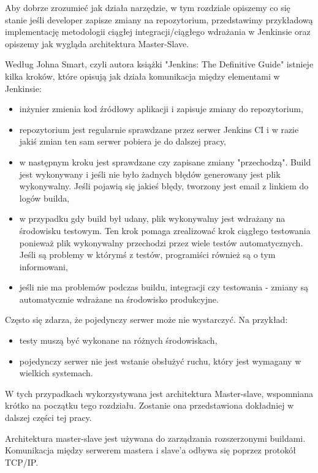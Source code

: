 Aby dobrze zrozumieć jak działa narzędzie, w tym rozdziale opiszemy co się stanie jeśli developer zapisze zmiany na repozytorium, przedstawimy przykładową implementację metodologii ciągłej integracji/ciągłego wdrażania w Jenkinsie oraz opiszemy jak wygląda architektura Master-Slave.

Według Johna Smart, czyli autora książki "Jenkins: The Definitive Guide"\cite{Jenkins} istnieje kilka kroków, które opisują jak działa komunikacja między elementami w Jenkinsie: 
\begin{itemize}
    \item inżynier zmienia kod źródłowy aplikacji i zapisuje zmiany do repozytorium,
    \item repozytorium jest regularnie sprawdzane przez serwer Jenkins CI i w razie jakiś zmian ten sam serwer pobiera je do dalszej pracy,
    \item w następnym kroku jest sprawdzane czy zapisane zmiany "przechodzą". Build  jest wykonywany i jeśli nie było żadnych błędów generowany jest plik wykonywalny. Jeśli pojawią się jakieś błędy, tworzony jest email z linkiem do logów builda,
    \item w przypadku gdy build był udany, plik wykonywalny jest wdrażany na środowisku testowym. Ten krok pomaga zrealizować krok ciągłego testowania ponieważ plik wykonywalny przechodzi przez wiele testów automatycznych. Jeśli są problemy w którymś z testów, programiści również są o tym informowani,
    \item jeśli nie ma problemów podczas buildu, integracji czy testowania - zmiany są automatycznie wdrażane na środowisko produkcyjne.
\end{itemize}



Często się zdarza, że pojedynczy serwer może nie wystarczyć. Na przykład:
\begin{itemize}
    \item testy muszą być wykonane na różnych środowiskach,
    \item pojedynczy serwer nie jest wstanie obsłużyć ruchu, który jest wymagany w wielkich systemach.
\end{itemize}

W tych przypadkach wykorzystywana jest architektura Master-slave, wspomniana krótko na początku tego rozdziału. Zostanie ona przedstawiona dokładniej w dalszej części tej pracy. 

Architektura master-slave jest używana do zarządzania rozszerzonymi buildami. Komunikacja między serwerem mastera i slave'a odbywa się poprzez protokół TCP/IP. 

